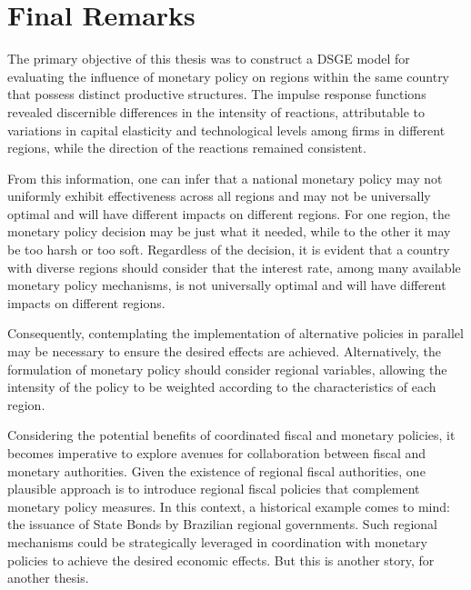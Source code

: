 \documentclass[../thesis.tex]{subfiles}
\begin{document}
	\newpage
	
	\section{Final Remarks}\label{sec:final-remarks}

The primary objective of this thesis was to construct a DSGE model for evaluating the influence of monetary policy on regions within the same country that possess distinct productive structures. The impulse response functions revealed discernible differences in the intensity of reactions, attributable to variations in capital elasticity and technological levels among firms in different regions, while the direction of the reactions remained consistent.

From this information, one can infer that a national monetary policy may not uniformly exhibit effectiveness across all regions and may not be universally optimal and will have different impacts on different regions. For one region, the monetary policy decision may be just what it needed, while to the other it may be too harsh or too soft. Regardless of the decision, it is evident that a country with diverse regions should consider that the interest rate, among many available monetary policy mechanisms, is not universally optimal and will have different impacts on different regions.

Consequently, contemplating the implementation of alternative policies in parallel may be necessary to ensure the desired effects are achieved. Alternatively, the formulation of monetary policy should consider regional variables, allowing the intensity of the policy to be weighted according to the characteristics of each region.

Considering the potential benefits of coordinated fiscal and monetary policies, it becomes imperative to explore avenues for collaboration between fiscal and monetary authorities. Given the existence of regional fiscal authorities, one plausible approach is to introduce regional fiscal policies that complement monetary policy measures. In this context, a historical example comes to mind: the issuance of State Bonds by Brazilian regional governments. Such regional mechanisms could be strategically leveraged in coordination with monetary policies to achieve the desired economic effects. But this is another story, for another thesis.
\end{document}
